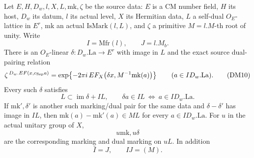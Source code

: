 \begin{proposition}
\label{prop:ftb-actual-dual-half-marking}
Let \(E,H,D_w,l,X,L,\mathrm{mk},\zeta\) be the source data:
\(E\) is a CM number field, \(H\) its host, \(D_w\) its datum,
\(l\) its actual level, \(X\) its Hermitian data, \(L\) a
self-dual \(O_E\)-lattice in \(E^r\), \(\mathrm{mk}\) an
actual \(\mathrm{IsMark}(l,L)\), and \(\zeta\) a primitive
\(M=l.M\)-th root of unity.
Write
\[
             I=\mathrm{Mfr}(l),\qquad J=l.M_b.
\]
There is an \(O_E\)-linear
\(\delta:D_w.\mathrm{La}\to E^r\) with image in \(L\) and
the exact source dual-pairing relation
\[
 \zeta^{\,D_w.EF(x,c_{\rm Sep}a)}
   =\exp\!\left\{-2\pi i\,
       EF_X\bigl(\delta x,M^{-1}\mathrm{mk}(a)\bigr)\right\}
                         \qquad(a\in I D_w.\mathrm{La}). \tag{DM10}
\]
Every such \(\delta\) satisfies
\[
 L\subset\operatorname{im}\delta+IL,\qquad
 \delta a\in IL\ \Longleftrightarrow\
                         a\in I D_w.\mathrm{La}.          \tag{DM11}
\]
If \(\mathrm{mk}',\delta'\) is another such marking/dual pair
for the same data and \(\delta-\delta'\) has image in \(IL\),
then
\(\mathrm{mk}(a)-\mathrm{mk}'(a)\in ML\) for every
\(a\in I D_w.\mathrm{La}\).
For \(u\) in the actual unitary group of \(X\),
\[
  u\mathrm{mk},u\delta
\]
are the corresponding marking and dual marking on \(uL\).
In addition
\[
                      \bar I=J,\qquad IJ=(M).             \tag{DM12}
\]
\end{proposition}

